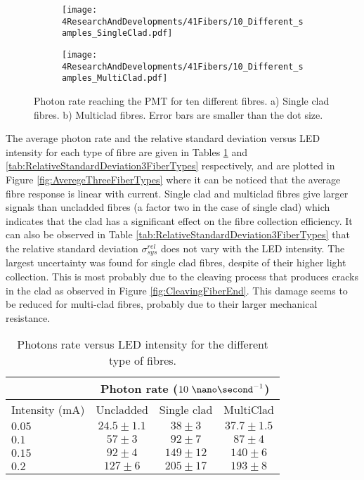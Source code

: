 \begin{figure}
\centering
    \begin{subfigure}[b]{1\textwidth}
    \centering
    \texttt{[image: 4ResearchAndDevelopments/41Fibers/10\_Different\_samples\_SingleClad.pdf]}  
    \caption{\label{subfig:10samplesSC}}
    \end{subfigure}
    \hfill
    \begin{subfigure}[b]{1\textwidth}
    \centering
    \texttt{[image: 4ResearchAndDevelopments/41Fibers/10\_Different\_samples\_MultiClad.pdf]}  
    \caption{\label{subfig:10samplesMC}}
    \end{subfigure}
 \caption{Photon rate reaching the PMT for ten different fibres. a) Single clad fibres. b) Multiclad fibres. Error bars are smaller than the dot size.}
 \label{fig:10samplesThreeTypes}
\end{figure}
The average photon rate and the relative standard deviation versus LED intensity for each type of fibre are given in Tables \ref{tab:10DifferentSamples} and \ref{tab:RelativeStandardDeviation3FiberTypes} respectively, and are plotted in Figure \ref{fig:AveregeThreeFiberTypes} where it can be noticed that the average fibre response is linear with current. Single clad and multiclad fibres give larger signals than uncladded fibres (a factor two in the case of single clad) which indicates that the clad has a significant effect on the fibre collection efficiency. It can also be observed in Table \ref{tab:RelativeStandardDeviation3FiberTypes} that the relative standard deviation $\sigma^{rel}_{sys}$ does not vary with the LED intensity. The largest uncertainty was found for single clad fibres, despite of their higher light collection. This is most probably due to the cleaving process that produces cracks in the clad as observed in Figure \ref{fig:CleavingFiberEnd}. This damage seems to be reduced for multi-clad fibres, probably due to their larger mechanical resistance.

\begin{table}[h]
\centering{}%
\begin{tabular}{lccc}
\toprule 
 & \multicolumn{3}{c}{Photon rate ($10~\nano\second^{-1}$)} \tabularnewline
\midrule
Intensity (mA) & Uncladded & Single clad & MultiClad \tabularnewline
\midrule
\midrule 
$0.05$ & $24.5 \pm 1.1$ & $38 \pm 3$ & $37.7 \pm 1.5$ \tabularnewline
$0.1$ & $57 \pm 3$ & $92 \pm 7$ & $87 \pm 4$ \tabularnewline
$0.15$ & $92 \pm 4$ & $149 \pm 12$ & $140 \pm 6$ \tabularnewline
$0.2$ & $127 \pm 6$ & $205 \pm 17$ & $193 \pm 8$ \tabularnewline
\bottomrule
\end{tabular}
\caption{Photons rate versus LED intensity for the different type of fibres.}
\label{tab:10DifferentSamples}
\end{table}

